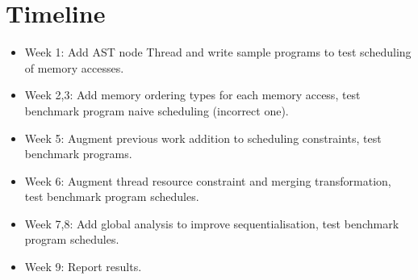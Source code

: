 \documentclass[sigplan,10pt,review]{acmart}
\begin{document}
    \section{Timeline}

        \begin{itemize}
            \item Week 1: Add AST node Thread and write sample programs to test scheduling of memory accesses.
            \item Week 2,3: Add memory ordering types for each memory access, test benchmark program naive scheduling (incorrect one).
            \item Week 5: Augment previous work addition to scheduling constraints, test benchmark programs. 
            \item Week 6: Augment thread resource constraint and merging transformation, test benchmark program schedules.
            \item Week 7,8: Add global analysis to improve sequentialisation, test benchmark program schedules.
            \item Week 9: Report results.
        \end{itemize}


    
    
\end{document}
